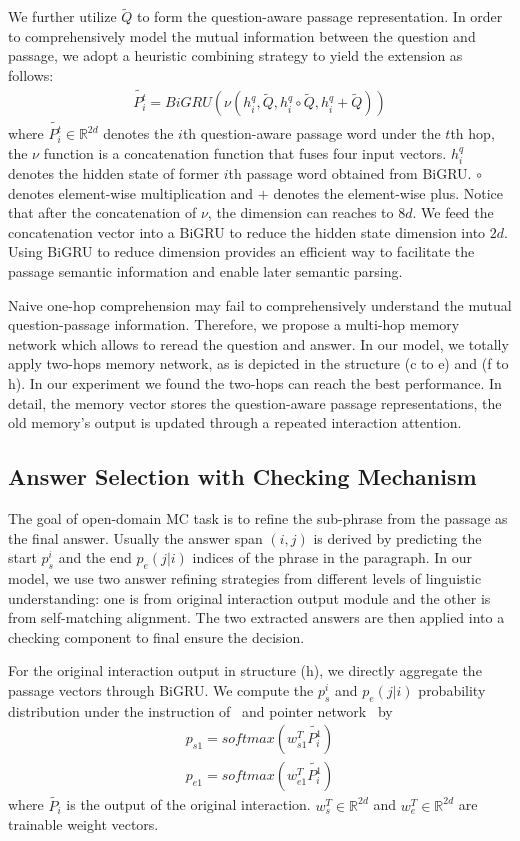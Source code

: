 \documentclass[letterpaper]{article} %
\begin{document}
We further utilize $\widetilde{Q}$ to form the question-aware passage representation. In order to comprehensively model the mutual information between the question and passage, we adopt a heuristic combining strategy to yield the extension as follows:
\begin{align*}
\widetilde{P_i^t}=BiGRU(\nu(h_i^q,\widetilde{Q},h_i^q \circ \widetilde{Q}, h_i^q + \widetilde{Q}) ) \tag{7}
\end{align*}
where $\widetilde{P_i^t}\in \mathbb{R}^{2d}$ denotes the $i$th question-aware passage word under the $t$th hop, the $\nu$ function is a concatenation function that fuses four input vectors. $h_i^q$ denotes the hidden state of former $i$th passage word obtained from BiGRU. $\circ$ denotes element-wise multiplication and $+$ denotes the element-wise plus. Notice that after the concatenation of $\nu$, the dimension can reaches to $8d$. We feed the concatenation vector into a BiGRU to reduce the hidden state dimension into $2d$. Using BiGRU to reduce dimension provides an efficient way to facilitate the passage semantic information and enable later semantic parsing.

Naive one-hop comprehension may fail to comprehensively understand the mutual question-passage information. Therefore, we propose a multi-hop memory network which allows to reread the question and answer. In our model, we totally apply two-hops memory network, as is depicted in the structure (c to e) and (f to h). In our experiment we found the two-hops can reach the best performance. In detail, the memory vector stores the question-aware passage representations, the old memory's output is updated through a repeated interaction attention. 
\subsection{Answer Selection with Checking Mechanism}
The goal of open-domain MC task is to refine the sub-phrase from the passage as the final answer. Usually the answer span $(i, j)$ is derived by predicting the start $p_s^i$ and the end $p_e(j|i)$ indices of the phrase in the paragraph. In our model, we use two answer refining strategies from different levels of linguistic understanding: one is from original interaction output module and the other is from self-matching alignment. The two extracted answers are then applied into a checking component to final ensure the decision.

For the original interaction output in structure (h), we directly aggregate the passage vectors through BiGRU. We compute the $p_s^i$ and $p_e(j|i)$ probability distribution under the instruction of~\cite{Wang2016Machine} and pointer network~\cite{Vinyals2015PointerN} by  
\begin{align*}
p_{s1}=softmax(w^T_{s1}\widetilde{P_i^1})\\
p_{e1}=softmax(w^T_{e1}\widetilde{P_i^1}) \tag{8}
\end{align*}
where $\widetilde{P_i}$ is the output of the original interaction. $w^T_s \in \mathbb{R}^{2d}$ and $w^T_e \in \mathbb{R}^{2d}$ are trainable weight vectors.  
\end{document}
